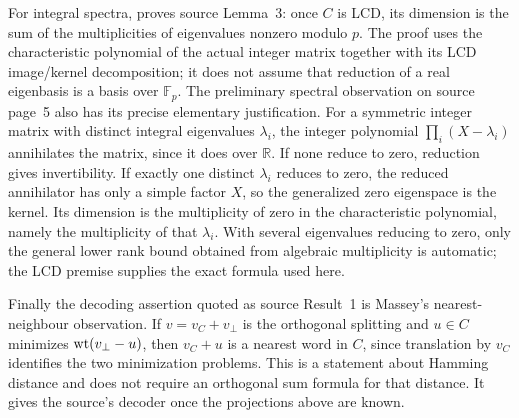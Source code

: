 For integral spectra,  proves source Lemma~3: once $C$
is LCD, its dimension is the sum of the multiplicities of eigenvalues
nonzero modulo $p$. The proof uses the characteristic polynomial of the
actual integer matrix together with its LCD image/kernel decomposition;
it does not assume that reduction of a real eigenbasis is a basis over
$\mathbb F_p$.
The preliminary spectral observation on source page~5 also has its
precise elementary justification. For a symmetric integer matrix with
distinct integral eigenvalues $\lambda_i$, the integer polynomial
$\prod_i(X-\lambda_i)$ annihilates the matrix, since it does over
$\mathbb R$. If none reduce to zero, reduction gives invertibility.
If exactly one distinct $\lambda_i$ reduces to zero, the reduced
annihilator has only a simple factor $X$, so the generalized zero
eigenspace is the kernel. Its dimension is the multiplicity of zero in
the characteristic polynomial, namely the multiplicity of that
$\lambda_i$. With several eigenvalues reducing to zero, only the
general lower rank bound obtained from algebraic multiplicity is
automatic; the LCD premise supplies the exact formula used here.

Finally the decoding assertion quoted as source Result~1 is Massey's
nearest-neighbour observation. If $v=v_C+v_\perp$ is the orthogonal
splitting and $u\in C$ minimizes $\operatorname{wt}(v_\perp-u)$, then $v_C+u$ is a
nearest word in $C$, since translation by $v_C$ identifies the two
minimization problems. This is a statement about Hamming distance and
does not require an orthogonal sum formula for that distance. It gives
the source's decoder once the projections above are known.
